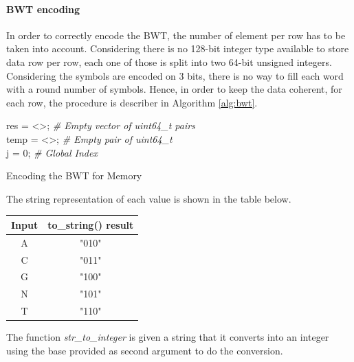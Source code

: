 \vspace*{8mm}

\paragraph{BWT encoding}

In order to correctly encode the BWT, the number of element per row has to be taken into account. Considering there is no 128-bit integer type available to store data row per row, each one of those is split into two 64-bit unsigned integers. Considering the symbols are encoded on 3 bits, there is no way to fill each word with a round number of symbols. Hence, in order to keep the data coherent, for each row, the procedure is describer in Algorithm \ref{alg:bwt}.\\


\vspace*{5mm}


\begin{minipage}[t]{0.55\textwidth}
\begin{algorithm}[H]
	\SetAlgoLined
	res = <>; \textit{\# Empty vector of uint64\_t pairs} \\
	temp = <>; \textit{\# Empty pair of uint64\_t} \\
	j = 0; \textit{\# Global Index}\\
\caption{Encoding the BWT for Memory
}
\label{alg:bwt}
\end{algorithm}
\end{minipage}
 \hfill
\begin{minipage}[t]{0.3 \textwidth}
The string representation of each value is shown in the table below.
\vspace*{5mm}


\begin{tabular}{|c|c|}
\hline
Input    &  to\_string() result\\
\hline
 A    &  "010" \\
 C    &  "011" \\
 G    &  "100" \\
 N    &  "101" \\
 T    &  "110" \\
\hline
\end{tabular}
\vspace*{3mm}

The function \textit{str\_to\_integer} is given a string that it converts into an integer using the base provided as second argument to do the conversion. \\
\end{minipage}
\vspace*{5mm}


